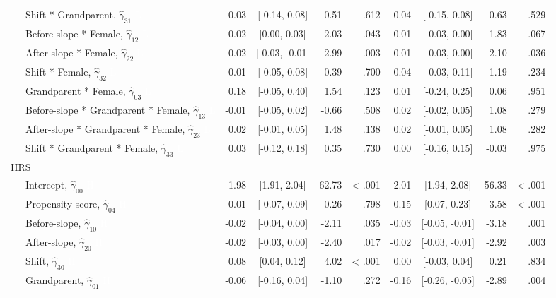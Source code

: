 \documentclass[
  english,
  man, noextraspace]{apa7}
\newenvironment{lltable}{\begin{landscape}\begin{center}\begin{ThreePartTable}}{\end{ThreePartTable}\end{center}\end{landscape}}
\begin{document}
\begin{appendix}
\begin{lltable}
{\begin{longtable}{lrcrrrcrr}
\ \ \ Shift * Grandparent, $\hat{\gamma}_{31}$ \textcolor{white}{L} & -0.03 & [-0.14, 0.08] & -0.51 & .612 & -0.04 & [-0.15, 0.08] & -0.63 & .529\\
\ \ \ Before-slope * Female, $\hat{\gamma}_{12}$ \textcolor{white}{L} & 0.02 & [0.00, 0.03] & 2.03 & .043 & -0.01 & [-0.03, 0.00] & -1.83 & .067\\
\ \ \ After-slope * Female, $\hat{\gamma}_{22}$ \textcolor{white}{L} & -0.02 & [-0.03, -0.01] & -2.99 & .003 & -0.01 & [-0.03, 0.00] & -2.10 & .036\\
\ \ \ Shift * Female, $\hat{\gamma}_{32}$ \textcolor{white}{L} & 0.01 & [-0.05, 0.08] & 0.39 & .700 & 0.04 & [-0.03, 0.11] & 1.19 & .234\\
\ \ \ Grandparent * Female, $\hat{\gamma}_{03}$ \textcolor{white}{L} & 0.18 & [-0.05, 0.40] & 1.54 & .123 & 0.01 & [-0.24, 0.25] & 0.06 & .951\\
\ \ \ Before-slope * Grandparent * Female, $\hat{\gamma}_{13}$ \textcolor{white}{L} & -0.01 & [-0.05, 0.02] & -0.66 & .508 & 0.02 & [-0.02, 0.05] & 1.08 & .279\\
\ \ \ After-slope * Grandparent * Female, $\hat{\gamma}_{23}$ \textcolor{white}{L} & 0.02 & [-0.01, 0.05] & 1.48 & .138 & 0.02 & [-0.01, 0.05] & 1.08 & .282\\
\ \ \ Shift * Grandparent * Female, $\hat{\gamma}_{33}$ \textcolor{white}{L} & 0.03 & [-0.12, 0.18] & 0.35 & .730 & 0.00 & [-0.16, 0.15] & -0.03 & .975\\
HRS &  &  &  &  &  &  &  & \\
\ \ \ Intercept, $\hat{\gamma}_{00}$ \textcolor{white}{H} & 1.98 & [1.91, 2.04] & 62.73 & < .001 & 2.01 & [1.94, 2.08] & 56.33 & < .001\\
\ \ \ Propensity score, $\hat{\gamma}_{04}$ \textcolor{white}{H} & 0.01 & [-0.07, 0.09] & 0.26 & .798 & 0.15 & [0.07, 0.23] & 3.58 & < .001\\
\ \ \ Before-slope, $\hat{\gamma}_{10}$ \textcolor{white}{H} & -0.02 & [-0.04, 0.00] & -2.11 & .035 & -0.03 & [-0.05, -0.01] & -3.18 & .001\\
\ \ \ After-slope, $\hat{\gamma}_{20}$ \textcolor{white}{H} & -0.02 & [-0.03, 0.00] & -2.40 & .017 & -0.02 & [-0.03, -0.01] & -2.92 & .003\\
\ \ \ Shift, $\hat{\gamma}_{30}$ \textcolor{white}{H} & 0.08 & [0.04, 0.12] & 4.02 & < .001 & 0.00 & [-0.03, 0.04] & 0.21 & .834\\
\ \ \ Grandparent, $\hat{\gamma}_{01}$ \textcolor{white}{H} & -0.06 & [-0.16, 0.04] & -1.10 & .272 & -0.16 & [-0.26, -0.05] & -2.89 & .004\\

\end{longtable}}
\end{lltable}
\end{appendix}
\end{document}
